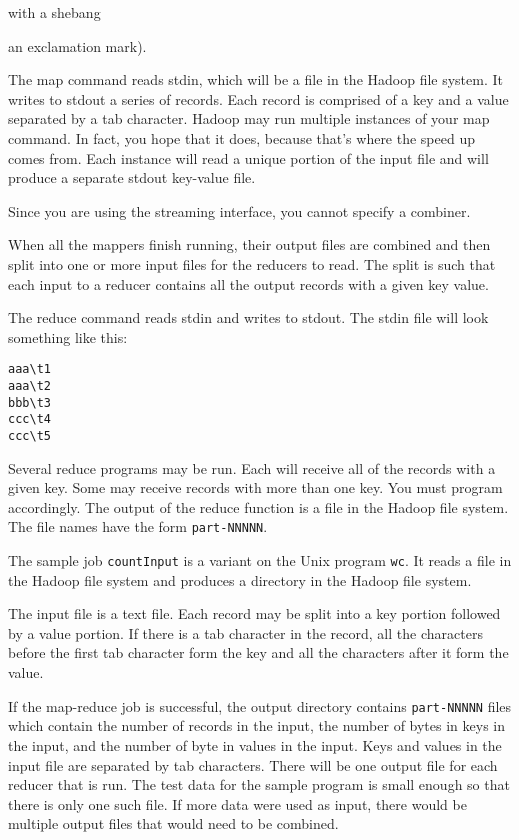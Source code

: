 \documentclass{article}
\let\code\texttt %
\begin{document}
with a shebang {an exclamation mark).

The map command reads stdin, which will be a file in the Hadoop file
system. It writes to stdout a series of records. Each record is
comprised of a key and a value separated by a tab character. Hadoop 
may run multiple instances of your map command. In fact, you hope that
it does, because that's where the speed up comes from. Each instance 
will read a unique portion of the input file and will
produce a separate stdout key-value file.

Since you are using the streaming interface, you cannot specify a
combiner. 

When all the mappers finish running, their output files are combined and
then split into one or more input files for the reducers to read. The
split is such that each input to a reducer contains all the output
records with a given key value.

The reduce command reads stdin and writes to stdout. The stdin file
will look something like this:

\begin{verbatim}
aaa\t1
aaa\t2
bbb\t3
ccc\t4
ccc\t5
\end{verbatim}

Several reduce programs may be run. Each will receive all of the records
with a given key. Some may receive records with more than one key. You
must program accordingly. The output of the reduce function is a file in
the Hadoop file system. The file names have the form \code{part-NNNNN}.

The sample job \code{countInput} is a variant on the Unix program
\code{wc}. It reads a file in the Hadoop file system and produces a
directory
in the Hadoop file system. 

The input file is a text file. Each record may be split into a key
portion followed by a value portion. If there is a tab character in the
record, all the characters before the first tab character form the key
and all the characters after it form the value.

If the map-reduce job is successful, the output directory contains
\code{part-NNNNN} files which contain the number of records in the
input, the number of bytes in keys in the input, and the number of byte
in values in the input. Keys and values in the input file are separated
by tab characters. There will be one output file for each reducer that
is run. The test data for the sample program is small enough so that
there is only one such file. If more data were used as input, there
would be multiple output files that would need to be combined.


}
\end{document}
